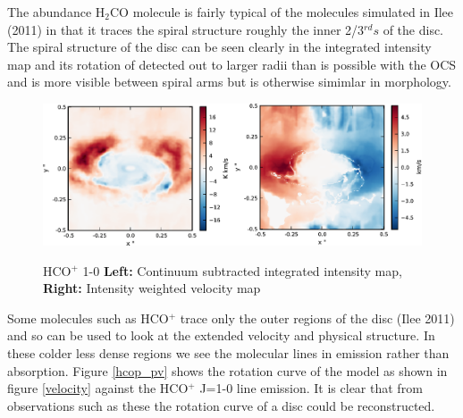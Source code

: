 \documentclass[useAMS,usenatbib]{mn2e}
\begin{document}

The abundance H$_2$CO molecule is fairly typical of the molecules simulated in Ilee (2011) in that it traces the spiral structure roughly the inner 2/3$^{rd}s$ of the disc. The spiral structure of the disc can be seen clearly in the integrated intensity map and its rotation of detected out to larger radii than is possible with the OCS and is more visible between spiral arms but is otherwise simimlar in morphology.

\begin{figure}
 \includegraphics[width=168mm]{Figures/sim/imageHCOp_1-0_30deg_composite_all.eps}
 \label{h2co_all}
 \caption{HCO$^+$ 1-0 {\bf Left:} Continuum subtracted integrated intensity map, {\bf Right:} Intensity weighted velocity map}
\end{figure}



Some molecules such as HCO$^+$ trace only the outer regions of the disc (Ilee 2011) and so can be used to look at the extended velocity and physical structure. In these colder less dense regions we see the molecular lines in emission rather than absorption. Figure \ref{hcop_pv} shows the rotation curve of the model as shown in figure \ref{velocity} against the HCO$^+$ J=1-0 line emission. It is clear that from observations such as these the rotation curve of a disc could be reconstructed.\newline
\end{document}
